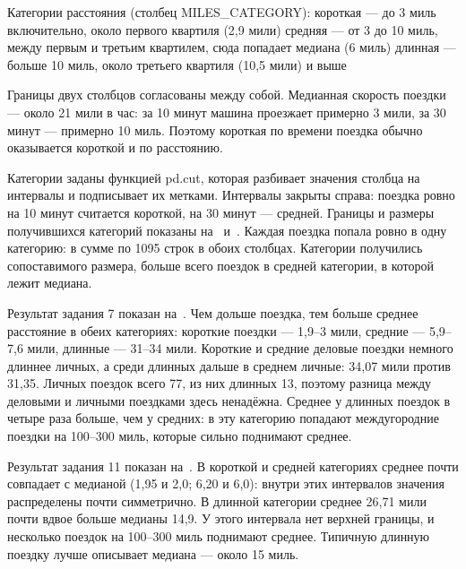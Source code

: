 \documentclass[a4paper,14pt]{extarticle}
\begin{document}
Категории расстояния (столбец MILES\_CATEGORY):
\suailist
короткая — до 3 миль включительно, около первого квартиля (2,9 мили)
средняя — от 3 до 10 миль, между первым и третьим квартилем, сюда попадает медиана (6 миль)
длинная — больше 10 миль, около третьего квартиля (10,5 мили) и выше

Границы двух столбцов согласованы между собой. Медианная скорость поездки — около 21 мили в час: за 10 минут машина проезжает примерно 3 мили, за 30 минут — примерно 10 миль. Поэтому короткая по времени поездка обычно оказывается короткой и по расстоянию.

Категории заданы функцией pd.cut, которая разбивает значения столбца на интервалы и подписывает их метками. Интервалы закрыты справа: поездка ровно на 10 минут считается короткой, на 30 минут — средней. Границы и размеры получившихся категорий показаны на~ и~. Каждая поездка попала ровно в одну категорию: в сумме по 1095 строк в обоих столбцах. Категории получились сопоставимого размера, больше всего поездок в средней категории, в которой лежит медиана.



Результат задания 7 показан на~. Чем дольше поездка, тем больше среднее расстояние в обеих категориях: короткие поездки — 1,9–3 мили, средние — 5,9–7,6 мили, длинные — 31–34 мили. Короткие и средние деловые поездки немного длиннее личных, а среди длинных дальше в среднем личные: 34,07 мили против 31,35. Личных поездок всего 77, из них длинных 13, поэтому разница между деловыми и личными поездками здесь ненадёжна. Среднее у длинных поездок в четыре раза больше, чем у средних: в эту категорию попадают междугородние поездки на 100–300 миль, которые сильно поднимают среднее.


Результат задания 11 показан на~. В короткой и средней категориях среднее почти совпадает с медианой (1,95 и 2,0; 6,20 и 6,0): внутри этих интервалов значения распределены почти симметрично. В длинной категории среднее 26,71 мили почти вдвое больше медианы 14,9. У этого интервала нет верхней границы, и несколько поездок на 100–300 миль поднимают среднее. Типичную длинную поездку лучше описывает медиана — около 15 миль.
\end{document}

